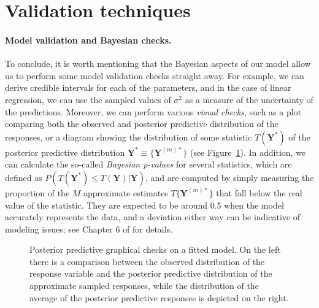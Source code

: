 \section{Validation techniques}

\paragraph{Model validation and Bayesian checks.} To conclude, it is worth mentioning that the Bayesian aspects of our model allow us to perform some model validation checks straight away. For example, we can derive credible intervals for each of the parameters, and in the case of linear regression, we can use the sampled values of \(\sigma^2\) as a measure of the uncertainty of the predictions. Moreover, we can perform various \textit{visual checks}, such as a plot comparing both the observed and posterior predictive distribution of the responses, or a diagram showing the distribution of some statistic \(T(\symbf Y^*)\) of the posterior predictive distribution \(\symbf Y^* \equiv \{\symbf Y^{(m)*}\}\) (see Figure~\ref{fig:ppc}). In addition, we can calculate the so-called \textit{Bayesian p-values} for several statistics, which are defined as \(P(T(\symbf Y^*)\leq T(\symbf Y)| \symbf Y)\), and are computed by simply measuring the proportion of the \(M\) approximate estimates \(T\{\symbf Y^{(m)*}\}\) that fall below the real value of the statistic. They are expected to be around 0.5 when the model accurately represents the data, and a deviation either way can be indicative of modeling issues; see Chapter 6 of \citet{gelman2013bayesian} for details.

\begin{figure}[ht]
  \centering
  \caption{Posterior predictive graphical checks on a fitted model. On the left there is a comparison between the observed distribution of the response variable and the posterior predictive distribution of the approximate sampled responses, while the distribution of the average of the posterior predictive responses is depicted on the right.}\label{fig:ppc}
\end{figure}
